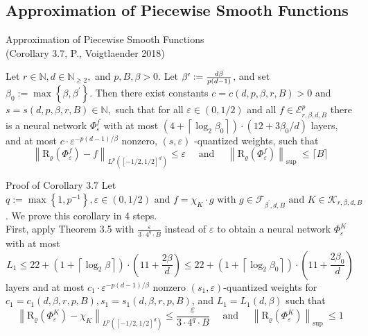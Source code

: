 \documentclass{if-beamer}
\newcommand{\defeq}{\vcentcolon=}
\begin{document}
\subsection{Approximation of Piecewise Smooth Functions}
\begin{frame}{Approximation of Piecewise Smooth Functions \\ (Corollary 3.7, P., Voigtlaender 2018)}
    \begin{tcolorbox}
        Let $r \in \mathbb{N}, d \in \mathbb{N}_{\geq 2},$ and $p, B, \beta>0 .$ Let $\beta^{\prime}\defeq \frac{d\beta}{p(d-1)}$, and set $\beta_{0}:=\max \left\{\beta, \beta^{\prime}\right\} .$ Then
        there exist constants $c=c(d, p, \beta, r, B)>0$ and $s=s(d, p, \beta, r, B) \in \mathbb{N},$ such that for all $\varepsilon \in(0,1 / 2)$ and all $f \in \mathcal{E}_{r, \beta, d, B}^{p}$ there is a neural network $\Phi_{\varepsilon}^{f}$ with at most $\left(4+\left\lceil\log _{2} \beta_{0}\right\rceil\right) \cdot\left(12+3 \beta_{0} / d\right)$ layers, and at most
        $c \cdot \varepsilon^{-p(d-1) / \beta}$ nonzero, $(s, \varepsilon)$ -quantized weights, such that
        {\small
        \[
        \left\|\mathrm{R}_{\varrho}\left(\Phi_{\varepsilon}^{f}\right)-f\right\|_{L^{p}\left([-1 / 2,1 / 2]^{d}\right)} \leq \varepsilon \quad \text { and } \quad\left\|\mathrm{R}_{\varrho}\left(\Phi_{\varepsilon}^{f}\right)\right\|_{\text {sup }} \leq\lceil B\rceil
        \]
        }%
    \end{tcolorbox}
\end{frame}

\begin{frame}{Proof of Corollary 3.7}
    Let $q:=\max \left\{1, p^{-1}\right\}, \varepsilon \in(0,1 / 2) \text { and } f=\chi_{K} \cdot g \text { with } g \in \mathcal{F}_{\beta^{\prime}, d, B} \text { and } K \in \mathcal{K}_{r, \beta, d, B}$. We prove this corollary in 4 steps.\\
    First, apply Theorem 3.5 with $\frac{\varepsilon}{3\cdot 4^q \cdot B}$ instead of $\varepsilon$ to obtain a neural network $\Phi_{\varepsilon}^K$ with at most $$L_1 \leq 22 + \left(1+\left\lceil\log _{2} \beta\right\rceil\right) \cdot(11+\frac{2\beta}{d}) \leq 22 + \left(1+\left\lceil\log _{2} \beta_0\right\rceil\right) \cdot(11+\frac{2\beta_0}{d})$$ layers and at most $c_1\cdot \varepsilon^{-p(d-1)/\beta}$ nonzero $(s_1,\varepsilon)$-quantized weights for $c_1=c_1(d,\beta,r,p,B), s_1=s_1(d,\beta,r,p,B)$, and $L_1=L_1(d,\beta)$ such that
    {\small
    $$\left\|\mathrm{R}_{\varrho}\left(\Phi_{\varepsilon}^{K}\right)-\chi_{K}\right\|_{L^{p}\left([-1 / 2,1 / 2]^{d}\right)} \leq \frac{\varepsilon}{3 \cdot 4^{q} \cdot B} \quad \text { and } \quad\left\|\mathrm{R}_{\varrho}\left(\Phi_{\varepsilon}^{K}\right)\right\|_{\text {sup }} \leq 1 $$
    }%
\end{frame}
\end{document}
